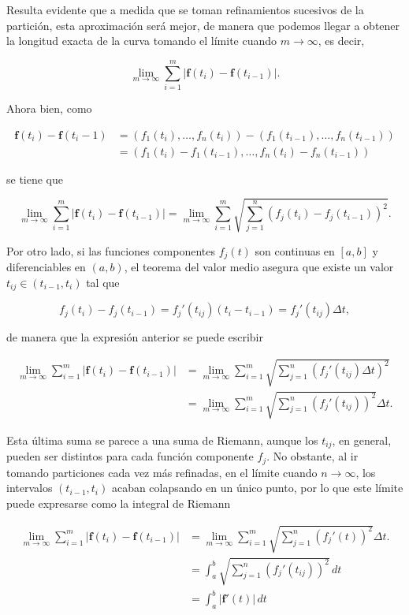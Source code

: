 \documentclass[
  a4paper,
]{scrreport}
\theoremstyle{definition}
\theoremstyle{plain}
\theoremstyle{plain}
\theoremstyle{definition}
\theoremstyle{definition}
\theoremstyle{plain}
\theoremstyle{remark}
\begin{document}
Resulta evidente que a medida que se toman refinamientos sucesivos de la
partición, esta aproximación será mejor, de manera que podemos llegar a
obtener la longitud exacta de la curva tomando el límite cuando
\(m\to\infty\), es decir,

\[
\lim_{m\to\infty}\sum_{i=1}^m |\mathbf{f}(t_i)-\mathbf{f}(t_{i-1})|.
\]

Ahora bien, como

\begin{align*}
\mathbf{f}(t_i)-\mathbf{f}(t_i-1) 
&= (f_1(t_i),\ldots,f_n(t_i))-(f_1(t_{i-1}),\ldots,f_n(t_{i-1})) \\
&= (f_1(t_i)-f_1(t_{i-1}),\ldots,f_n(t_i)-f_n(t_{i-1}))
\end{align*}

se tiene que

\[
\lim_{m\to\infty}\sum_{i=1}^m |\mathbf{f}(t_i)-\mathbf{f}(t_{i-1})| =
\lim_{m\to\infty}\sum_{i=1}^m \sqrt{\sum_{j=1}^n (f_j(t_i)-f_j(t_{i-1}))^2}.
\]

Por otro lado, si las funciones componentes \(f_j(t)\) son continuas en
\([a,b]\) y diferenciables en \((a,b)\), el teorema del valor medio
asegura que existe un valor \(t_{ij}\in(t_{i-1},t_i)\) tal que

\[
f_j(t_i)-f_j(t_{i-1}) = f_j'(t_{ij})(t_i-t_{i-1}) = f_j'(t_{ij}) \Delta t,
\]

de manera que la expresión anterior se puede escribir

\begin{align*}
\lim_{m\to\infty}\sum_{i=1}^m |\mathbf{f}(t_i)-\mathbf{f}(t_{i-1})| 
&= \lim_{m\to\infty}\sum_{i=1}^m \sqrt{\sum_{j=1}^n (f_j'(t_{ij})\Delta t)^2} \\
&= \lim_{m\to\infty}\sum_{i=1}^m \sqrt{\sum_{j=1}^n (f_j'(t_{ij}))^2}\Delta t.
\end{align*}

Esta última suma se parece a una suma de Riemann, aunque los \(t_{ij}\),
en general, pueden ser distintos para cada función componente \(f_j\).
No obstante, al ir tomando particiones cada vez más refinadas, en el
límite cuando \(n\to\infty\), los intervalos \((t_{i-1},t_i)\) acaban
colapsando en un único punto, por lo que este límite puede expresarse
como la integral de Riemann

\begin{align*}
\lim_{m\to\infty}\sum_{i=1}^m |\mathbf{f}(t_i)-\mathbf{f}(t_{i-1})| 
&= \lim_{m\to\infty}\sum_{i=1}^m \sqrt{\sum_{j=1}^n (f_j'(t))^2}\Delta t. \\
&= \int_a^b \sqrt{\sum_{j=1}^n (f_j'(t_{ij}))^2}\, dt \\
&= \int_a^b |\mathbf{f}'(t)|\, dt
\end{align*}
\end{document}
